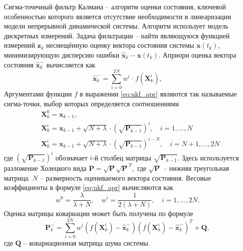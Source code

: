 Сигма-точечный фильтр Калмана -- алгоритм оценки состояния, ключевой особенностью которого является отсутствие необходимости в линеаризации модели непрерывной динамической системы. Алгоритм использует модель дискретных измерений.
Задача фильтрации -- найти являющуюся функцией измерений $\bm z_k$ несмещённую оценку вектора состояния системы  $\bm x(t_k)$, минимизирующую дисперсию ошибки  ${\hat{\bm{x}}_k} - \bm x({t_k})$.
Априори оценка вектора состояния $\bm{\hat x}_k^-$ вычисляется как
\begin{equation} \label{eq:ukf_apr}
{\bm{\hat x}}_k^-  = \sum\limits_{i = 0}^{2N} {{w^i} \cdot } \,f\left( {{\bm{X}}_k^i} \right),
\end{equation}
Аргументами функции $f$ в выражении \eqref{eq:ukf_apr} являются так называемые сигма-точки, выбор которых определяется соотношениями
\begin{equation} \label{eq:ukf_points}
\begin{aligned}
&{{\bm{X}}_k^0 = {{\bm{x}}_{k - 1}}},
\\
&{{\bm{X}}_k^i = {{\bm{x}}_{k - 1}} + \sqrt {N + {{\lambda }}}  \cdot {{\left( {\sqrt {{{\bm{P}}_{k - 1}}} } \right)}^i}}, \quad {i = 1,...,N}
\\
&{{\bm{X}}_k^i = {{\bm{x}}_{k - 1}} + \sqrt {N + {{\lambda }}}  \cdot {{\left( {\sqrt {{{\bm{P}}_{k - 1}}} } \right)}^{i - N}}}, \quad {i = N + 1,...,2N}
\end{aligned}
\end{equation}
где
${{{\left( {\sqrt {{{\bm{P}}_{k - 1}}} } \right)}^i}}$
обозначает  $i$-й столбец матрицы ${\sqrt {{{\bm{P}}_{k - 1}}} }$.  Здесь используется разложение Холецкого \cite{Verbjitsky01} вида
${\bm{P}} = \sqrt {\bm{P}} {\sqrt {\bm{P}} ^T},$
где $\sqrt {\bm{P}}$ -- нижняя треугольная матрица. $N$ -- размерность оцениваемого вектора состояния. Весовые коэффициенты в формуле \eqref{eq:ukf_apr} вычисляются как
\begin{equation}
{w^0} = \frac{{{\lambda }}}{{{{\lambda }} + N}},
\quad
{w^i} = \frac{1}{{2\left( {{{\lambda }} + N} \right)}},
\quad
i = 1,...,2N.
\end{equation}
Оценка матрицы ковариации может быть получена по формуле
\begin{equation} \label{eq:ukf_p_apr}
{\bm{P}}_k^ -  = \sum\limits_{i = 0}^{2N} {{w^i}\left( {f\left( {{\bm{X}}_k^i} \right) - {\bm{\hat x}}_k^ - } \right)} {\left( {f\left( {{\bm{X}}_k^i} \right) - {\bm{\hat x}}_k^ - } \right)^{{T}}} + {\bm{Q}},
\end{equation}
где $\bm{Q}$ -- ковариационная матрица шума системы.

